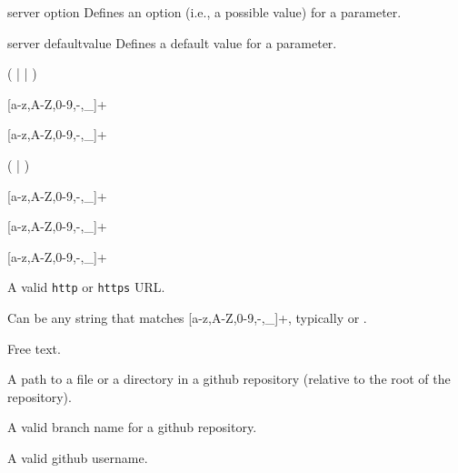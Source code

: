 \bigskip
\xmlstruct
{server}
{option}
{%
Defines an option (i.e., a possible value) for a parameter.
}


\bigskip
\xmlstruct
{server}
{defaultvalue}
{%
Defines a default value for a parameter.
}



\bigskip
\noindent
{}

(  |  | )

\bigskip
\noindent
{}

[a-z,A-Z,0-9,-,\_]+

\bigskip
\noindent
{}

[a-z,A-Z,0-9,-,\_]+

\bigskip
\noindent
{}

(  |  )

\bigskip
\noindent
{}

[a-z,A-Z,0-9,-,\_]+

\bigskip
\noindent
{}

[a-z,A-Z,0-9,-,\_]+

\bigskip
\noindent
{}

[a-z,A-Z,0-9,-,\_]+

\bigskip
\noindent
{}

A valid \texttt{http} or \texttt{https} URL.

\bigskip
\noindent
{}

Can be any string that matches [a-z,A-Z,0-9,-,\_]+, typically
 or .

\bigskip
\noindent
{}

Free text.

\bigskip
\noindent
{}

A path to a file or a directory in a github repository (relative to
the root of the repository).

\bigskip
\noindent
{}

A valid branch name for a github repository.

\bigskip
\noindent
{}

A valid github username.

\bigskip
\noindent
{}

